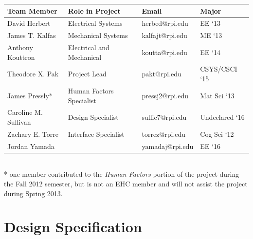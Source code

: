 \documentclass[12pt,draft,oneside]{article}
\begin{document}
\begin{table}[h]
  \small
  \begin{tabular}{l l l l }
    \hline
    Team Member           & Role in Project           & Email           & Major \\
    \hline
    David Herbert         & Electrical Systems        & herbed@rpi.edu  & EE `13 \\
    James T. Kalfas       & Mechanical Systems        & kalfajt@rpi.edu & ME `13  \\
    Anthony Kouttron      & Electrical and Mechanical & koutta@rpi.edu  & EE `14 \\
    Theodore X. Pak       & Project Lead              & pakt@rpi.edu    & CSYS/CSCI `15\\
    James Pressly*        & Human Factors Specialist  & pressj2@rpi.edu & Mat Sci `13  \\
    Caroline M. Sullivan  & Design Specialist         & sullic7@rpi.edu & Undeclared `16  \\
    Zachary E. Torre      & Interface Specialist      & torrez@rpi.edu  & Cog Sci `12 \\
    Jordan Yamada         &                           & yamadaj@rpi.edu & EE `16  \\
    \hline
  \end{tabular}\\
  * one member contributed to the \emph{Human Factors} portion of the project during the Fall 2012 semester, but is not an EHC member and will not assist the project during Spring 2013.
\end{table}


\section{Design Specification}
\label{sec:spec}
\end{document}
